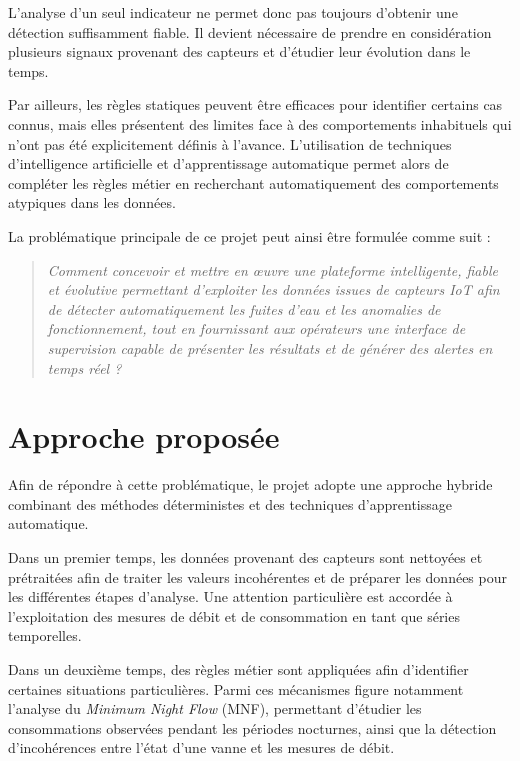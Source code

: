 L'analyse d'un seul indicateur ne permet donc pas toujours d'obtenir une
détection suffisamment fiable. Il devient nécessaire de prendre en
considération plusieurs signaux provenant des capteurs et d'étudier leur
évolution dans le temps.

Par ailleurs, les règles statiques peuvent être efficaces pour identifier
certains cas connus, mais elles présentent des limites face à des
comportements inhabituels qui n'ont pas été explicitement définis à l'avance.
L'utilisation de techniques d'intelligence artificielle et d'apprentissage
automatique permet alors de compléter les règles métier en recherchant
automatiquement des comportements atypiques dans les données.

La problématique principale de ce projet peut ainsi être formulée comme suit :

\begin{quote}
\textit{
Comment concevoir et mettre en œuvre une plateforme intelligente, fiable
et évolutive permettant d'exploiter les données issues de capteurs IoT afin
de détecter automatiquement les fuites d'eau et les anomalies de
fonctionnement, tout en fournissant aux opérateurs une interface de
supervision capable de présenter les résultats et de générer des alertes
en temps réel ?
}
\end{quote}


\section{Approche proposée}

Afin de répondre à cette problématique, le projet adopte une approche hybride
combinant des méthodes déterministes et des techniques d'apprentissage
automatique.

Dans un premier temps, les données provenant des capteurs sont nettoyées et
prétraitées afin de traiter les valeurs incohérentes et de préparer les
données pour les différentes étapes d'analyse. Une attention particulière est
accordée à l'exploitation des mesures de débit et de consommation en tant que
séries temporelles.

Dans un deuxième temps, des règles métier sont appliquées afin d'identifier
certaines situations particulières. Parmi ces mécanismes figure notamment
l'analyse du \textit{Minimum Night Flow} (MNF), permettant d'étudier les
consommations observées pendant les périodes nocturnes, ainsi que la détection
d'incohérences entre l'état d'une vanne et les mesures de débit.

